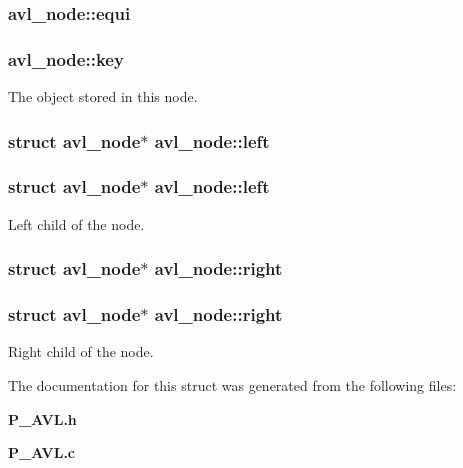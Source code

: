 \subsubsection{ avl\_\-node::equi}\label{structavl__node_m3}


\subsubsection{ avl\_\-node::key}\label{structavl__node_m0}


The object stored in this node.

\subsubsection{\setlength{\rightskip}{0pt plus 5cm}struct avl\_\-node$\ast$ avl\_\-node::left}\label{structavl__node_m4}


\subsubsection{\setlength{\rightskip}{0pt plus 5cm}struct avl\_\-node$\ast$ avl\_\-node::left}\label{structavl__node_m1}


Left child of the node.

\subsubsection{\setlength{\rightskip}{0pt plus 5cm}struct avl\_\-node$\ast$ avl\_\-node::right}\label{structavl__node_m5}


\subsubsection{\setlength{\rightskip}{0pt plus 5cm}struct avl\_\-node$\ast$ avl\_\-node::right}\label{structavl__node_m2}


Right child of the node.



The documentation for this struct was generated from the following files:\begin{CompactItemize}
\item 
{\bf P\_\-AVL.h}\item 
{\bf P\_\-AVL.c}\end{CompactItemize}
